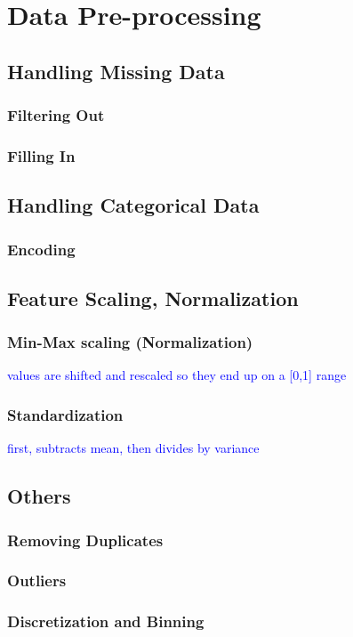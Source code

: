 \section{Data Pre-processing}

\subsection{Handling Missing Data}

\subsubsection{Filtering Out}

\subsubsection{Filling In}

\subsection{Handling Categorical Data}

\subsubsection{Encoding}

\subsection{Feature Scaling, Normalization}

\subsubsection{Min-Max scaling (Normalization)}

\textcolor{blue}{values are shifted and rescaled so they end up on a [0,1] range}

\subsubsection{Standardization}

\textcolor{blue}{first, subtracts mean, then divides by variance}



\subsection{Others}

\subsubsection{Removing Duplicates}

\subsubsection{Outliers}

\subsubsection{Discretization and Binning}
